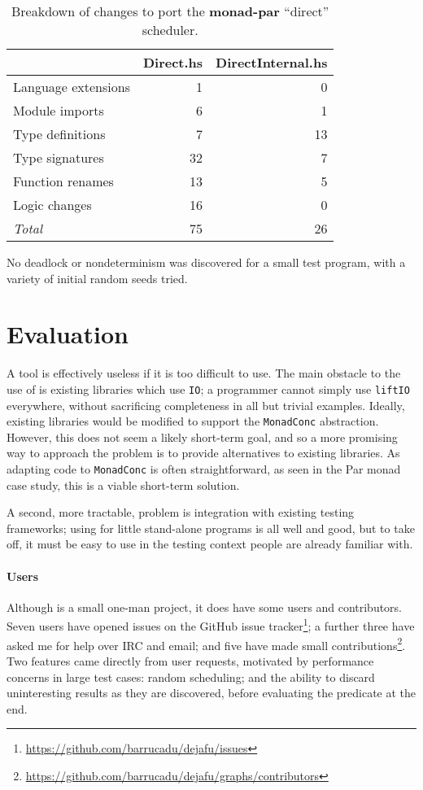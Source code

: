 \begin{table}
  \centering
  \begin{tabular}{lrr} \toprule
    & Direct.hs & DirectInternal.hs \\ \midrule
    Language extensions & 1 & 0 \\
    Module imports & 6 & 1 \\
    Type definitions & 7 & 13 \\
    Type signatures & 32 & 7 \\
    Function renames & 13 & 5 \\
    Logic changes & 16 & 0 \\ \midrule
    \emph{Total} & 75 & 26 \\ \bottomrule
  \end{tabular}
  \caption{Breakdown of changes to port the \textbf{monad-par} ``direct'' scheduler.}\label{tbl:example-parmonad-diff}
\end{table}

No deadlock or nondeterminism was discovered for a small test program,
with a variety of initial random seeds tried.

\section{Evaluation}
\label{sec:dejafu-evaluation}

A tool is effectively useless if it is too difficult to use.  The main
obstacle to the use of \dejafu{} is existing libraries which use
\verb|IO|; a programmer cannot simply use \verb|liftIO| everywhere,
without sacrificing completeness in all but trivial examples.
Ideally, existing libraries would be modified to support the
\verb|MonadConc| abstraction.  However, this does not seem a likely
short-term goal, and so a more promising way to approach the problem
is to provide alternatives to existing libraries.  As adapting code to
\verb|MonadConc| is often straightforward, as seen in the Par monad
case study, this is a viable short-term solution.

A second, more tractable, problem is integration with existing testing
frameworks; using \dejafu{} for little stand-alone programs is all
well and good, but to take off, it must be easy to use in the testing
context people are already familiar with.

\paragraph{Users}
Although \dejafu{} is a small one-man project, it does have some users
and contributors.  Seven users have opened issues on the GitHub issue
tracker\footnote{\url{https://github.com/barrucadu/dejafu/issues}}; a
further three have asked me for help over IRC and email; and five have
made small
contributions\footnote{\url{https://github.com/barrucadu/dejafu/graphs/contributors}}.
Two features came directly from user requests, motivated by
performance concerns in large test cases: random scheduling; and the
ability to discard uninteresting results as they are discovered,
before evaluating the predicate at the end.


